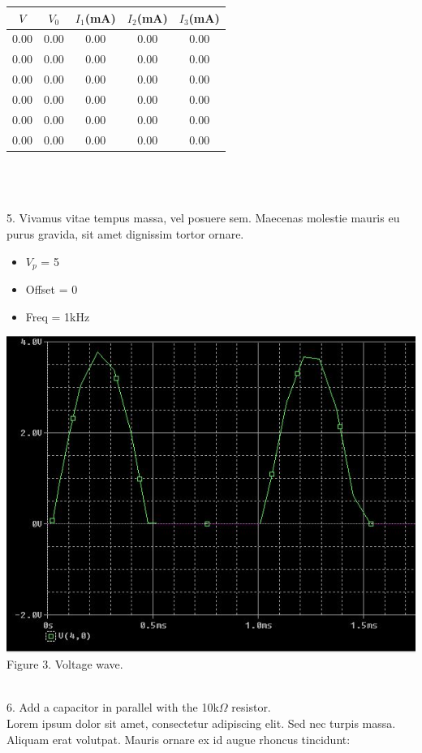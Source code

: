 \documentclass[article]{IEEEtran}
\begin{document}
\begin{tabular}{|c|c|c|c|c|}
     \hline
     $V$ & $V_0$ & $I_1$(mA) & $I_2$(mA) & $I_3$(mA) \\
     \hline
     0.00 & 0.00 & 0.00 & 0.00 & 0.00 \\
     \hline
     0.00 & 0.00 & 0.00 & 0.00 & 0.00 \\
     \hline
     0.00 & 0.00 & 0.00 & 0.00 & 0.00 \\
     \hline
     0.00 & 0.00 & 0.00 & 0.00 & 0.00 \\
    \hline
    0.00 & 0.00 & 0.00 & 0.00 & 0.00 \\
    \hline
    0.00 & 0.00 & 0.00 & 0.00 & 0.00 \\
    \hline
\end{tabular}
\\
\\
\\
5. Vivamus vitae tempus massa, vel posuere sem. Maecenas molestie mauris eu purus gravida, sit amet dignissim tortor ornare.
\begin{itemize}
    \item $V_p$ = 5
    \item Offset = 0
    \item Freq = 1kHz
\end{itemize}
\begin{center}
\includegraphics[scale=0.5]{elec_fig3.JPG}  Figure 3. Voltage wave.
\end{center}

\\
6. Add a capacitor in parallel with the 10k$\Omega$ resistor. \\
Lorem ipsum dolor sit amet, consectetur adipiscing elit. Sed nec turpis massa. Aliquam erat volutpat. Mauris ornare ex id augue rhoncus tincidunt: 
\end{document}
